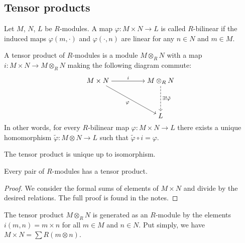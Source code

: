 \documentclass[11pt,a4paper]{article}
\begin{document}

\subsection{Tensor products}
\begin{definition}[$R$-modules]
  Let $M$, $N$, $L$ be $R$-modules.
  A map $\varphi \colon M \times N \to L$ is called $R$-bilinear
  if the induced maps $\varphi(m,\cdot)$ and $\varphi(\cdot,n)$
  are linear for any $n \in N$ and $m \in M$.
\end{definition}

\begin{definition}
  A tensor product of $R$-modules is a module
  $M \otimes_{R} N$ with a map $i \colon M \times N \to M \otimes_{R} N$
  making the following diagram commute:
  \[\begin{tikzcd}[ampersand replacement=\&,cramped]
    {M \times N} \&\& {M \otimes_R N} \\
    \\
    \&\& L
    \arrow["i", from=1-1, to=1-3]
    \arrow["\varphi"', from=1-1, to=3-3]
    \arrow["{\exists ! \tilde \varphi}", dashed, from=1-3, to=3-3]
  \end{tikzcd}\]
  In other words, for every $R$-bilinear map
  $\varphi \colon M \times N \to L$ there exists
  a unique homomorphism $\tilde\varphi \colon M \otimes N \to L$
  such that $\tilde \varphi \circ i = \varphi$.
\end{definition}

\begin{remark}
  The tensor product is unique up to isomorphism.
\end{remark}

\begin{proposition}
  Every pair of $R$-modules
  has a tensor product.
\end{proposition}
\begin{proof}
  We consider the formal sums of elements of $M \times N$
  and divide by the desired relations.
  The full proof is found in the notes.
\end{proof}

\begin{remark}
  The tensor product $M \otimes_R N$ is generated as an $R$-module
  by the elements $i(m,n) = m \times n$ for all $m \in M$ and $n \in N$.
  Put simply, we have $M \times N = \sum R(m \otimes n)$.
\end{remark}
\end{document}
